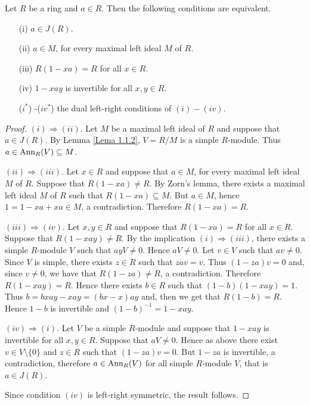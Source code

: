 \begin{theorem}[Jacobson]\label{Teorema 1.3.1}
Let $R$ be a ring and $a\in R$. Then the following conditions are equivalent.
\begin{itemize}\item[(i)] $a\in J(R)$.
\item[(ii)] $a\in  M$, for every maximal left ideal $M$ of $R$.
\item[(iii)] $R(1-xa)=R$ for all $x\in R$.
\item[(iv)] $1-xay$ is invertible for all $x,y\in R$.
\item[($i^*$)]-($iv^*$) the dual left-right conditions of $(i)-(iv)$.
\end{itemize}
\end{theorem}

\begin{proof}
$(i)\Rightarrow (ii)$. Let $M$ be a maximal left ideal of
$R$ and suppose that $a\in J(R)$. By Lemma \ref{Lema 1.1.2}, $V=R/M$ is a simple $R$-module. Thus $a\in \operatorname{Ann}_R(V)\subseteq M$.

$(ii)\Rightarrow (iii)$. Let $x\in R$ and suppose that $a\in  M$, for every maximal left ideal $M$ of $R$. Suppose that
$R(1-xa)\neq R$. By Zorn's lemma, there exists a maximal left ideal $M$ of $R$ such that
$R(1-xa)\subseteq M$. But $a\in M$, hence $1=1-xa+xa\in M$, a contradiction. Therefore $R(1-xa)=R$.

$(iii)\Rightarrow (iv)$. Let $x,y\in R$ and suppose that $R(1-xa)=R$ for all $x\in R$. Suppose that $R(1-xay)\neq
R$. By the implication $(i)\Rightarrow (iii)$, there exists a simple $R$-module $V$ such that $ayV\neq 0$. Hence $aV\neq 0$. 
Let $v\in V$ such that $av\neq
0$. Since $V$ is simple, there exists $z\in R$ such that $zav=v$. Thus
$(1-za)v=0$ and, since $v\neq 0$, we have that $R(1-za)\neq R$, a contradiction. Therefore $R(1-xay)=R$. Hence there exists $b\in R$
such that $(1-b)(1-xay)=1$. Thus $b=bxay-xay=(bx-x)ay$ and, then we get that $R(1-b)=R$. Hence $1-b$ is invertible 
and $(1-b)^{-1}=1-xay$.

$(iv)\Rightarrow (i)$. Let $V$ be a simple $R$-module and suppose that $1-xay$ is invertible for all $x,y\in R$. 
Suppose that $aV\neq 0$. Hence as above there exist $v\in V\setminus\{ 0\}$ and $z\in R$
such that $(1-za)v=0$. But $1-za$ is invertible, a contradiction, therefore $a\in \operatorname{Ann}_R(V)$ for all simple $R$-module $V$, that is 
$a\in J(R)$. 

Since condition $(iv)$ is left-right symmetric, the result follows.
\end{proof}

